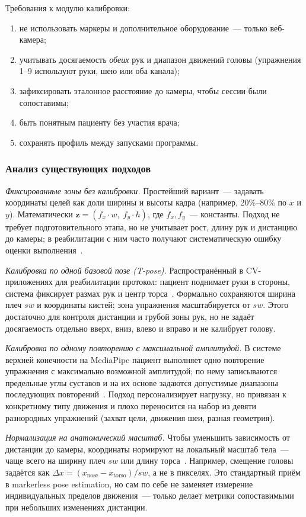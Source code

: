 Требования к модулю калибровки:
\begin{enumerate}
    \item не использовать маркеры и дополнительное оборудование~---
    только веб-камера;
    \item учитывать досягаемость \emph{обеих} рук и диапазон движений
    головы (упражнения 1--9 используют руки, шею или оба канала);
    \item зафиксировать эталонное расстояние до камеры, чтобы сессии
    были сопоставимы;
    \item быть понятным пациенту без участия врача;
    \item сохранять профиль между запусками программы.
\end{enumerate}

\subsubsection{Анализ существующих подходов}

\emph{Фиксированные зоны без калибровки.}
Простейший вариант~--- задавать координаты целей как доли ширины и
высоты кадра (например, 20\%--80\% по $x$ и $y$). Математически
$\mathbf{z} = (f_x \cdot w,\; f_y \cdot h)$, где $f_x, f_y$~---
константы. Подход не требует подготовительного этапа, но не
учитывает рост, длину рук и дистанцию до камеры; в реабилитации
с ним часто получают систематическую ошибку оценки
выполнения~\cite{hou2025}.

\emph{Калибровка по одной базовой позе (T-pose).}
Распространённый в CV-приложениях для реабилитации протокол: пациент
поднимает руки в стороны, система фиксирует размах рук и центр
торса~\cite{smartreflex}. Формально сохраняются ширина плеч $sw$ и
координаты кистей; зона упражнения масштабируется от $sw$. Этого
достаточно для контроля дистанции и грубой зоны рук, но не задаёт
досягаемость отдельно вверх, вниз, влево и вправо и не калибрует
голову.

\emph{Калибровка по одному повторению с максимальной амплитудой.}
В системе верхней конечности на MediaPipe пациент выполняет одно
повторение упражнения с максимально возможной амплитудой; по нему
записываются предельные углы суставов и на их основе задаются
допустимые диапазоны последующих повторений~\cite{hou2025}. Подход
персонализирует нагрузку, но привязан к конкретному типу движения
и плохо переносится на набор из девяти разнородных упражнений
(захват цели, движения шеи, разная геометрия).

\emph{Нормализация на анатомический масштаб.}
Чтобы уменьшить зависимость от дистанции до камеры, координаты
нормируют на локальный масштаб тела~--- чаще всего на ширину плеч
$sw$ или длину торса~\cite{mediapipe_pose,hou2025}. Например,
смещение головы задаётся как $\Delta x = (x_{\mathrm{nose}} -
x_{\mathrm{torso}}) / sw$, а не в пикселях. Это стандартный приём
в markerless pose estimation, но сам по себе не заменяет измерение
индивидуальных пределов движения~--- только делает метрики
сопоставимыми при небольших изменениях дистанции.

